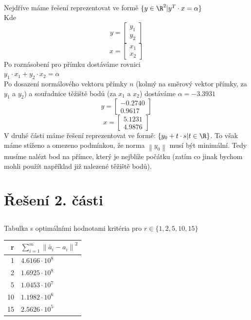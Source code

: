 \documentclass[10pt,a4paper,openright]{article}
\newcommand{\norm}[1]{\left\lVert#1\right\rVert}
\begin{document}
\subsection{}
\begin{center}
    Nejdříve máme řešení reprezentovat ve formě $\{ y \in \R ^ 2 | y ^ T \cdot x = \alpha \}$\\
    Kde
    \[y =
    \begin{bmatrix}
        y_1\\
        y_2
    \end{bmatrix}\]
    \[x =
    \begin{bmatrix}
        x_1\\
        x_2
    \end{bmatrix}\]
    Po roznásobení pro přímku dostáváme rovnici\\
    $y_1 \cdot x_1 + y_2 \cdot x_2 = \alpha$\\
    Po dosazení normálového vektoru přímky $n$ (kolmý na směrový vektor přímky, za $y_1$ a $y_2$)
    a souřadnice těžiště bodů (za $x_1$ a $x_2$)
    dostáváme $\alpha = -3.3931$\\
    \[y =
    \begin{bmatrix}
        -0.2740\\
        0.9617
    \end{bmatrix}\]
    \[x =
    \begin{bmatrix}
        5.1231\\
        4.9876
    \end{bmatrix}\]
    V druhé části máme řešení reprezentovat ve formě: $\{y_0 + t \cdot s | t \in \R \}$.
    To však máme stíženo a omezeno podmínkou, že norma $\norm{y_0}$ musí být minimální. Tedy
    musíme nalézt bod na přímce, který je nejblíže počátku (zatím co jinak bychom mohli použít například
    již nalezené těžiště bodů).
\end{center}

\section{Řešení 2. části}

\subsection{}
\begin{center}
Tabulka s optimálními hodnotami kritéria pro $r \in \{1,2,5,10,15\}$\\
\begin{tabular}{|r|l|}
    \hline
    r & $\sum_{i=1}^{m} \norm{\tilde{a_i} - a_i}^2$ \\
    \hline \hline
    1 & $4.6166 \cdot 10^8$ \\
    2 & $1.6925 \cdot 10^8$ \\
    5 & $1.0453 \cdot 10^7$\\
    10 & $1.1982 \cdot 10^6$\\
    15 & $2.5626 \cdot 10^5$\\
    \hline
\end{tabular}
\end{center}
\end{document}
